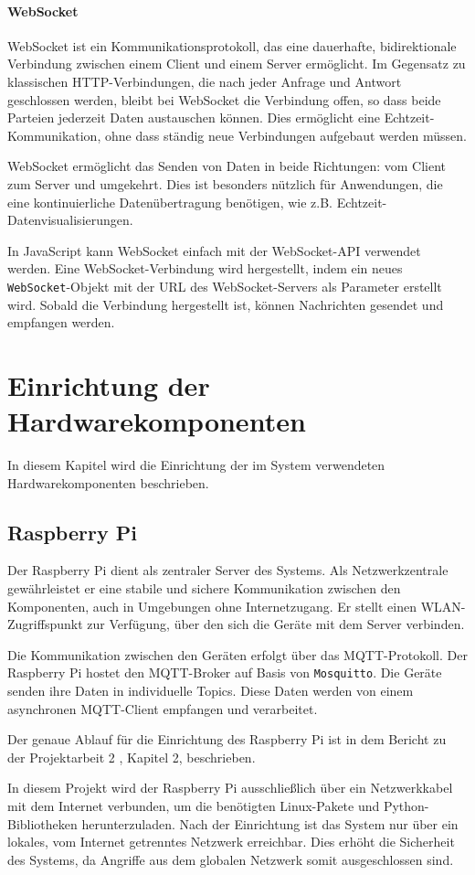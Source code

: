 \documentclass[12pt, letterpaper]{article}
\begin{document}
  \paragraph{WebSocket}  
  \par \textbf{}
  \par WebSocket ist ein Kommunikationsprotokoll, das eine dauerhafte, bidirektionale Verbindung zwischen einem Client und einem Server ermöglicht. Im Gegensatz zu klassischen HTTP-Verbindungen, die nach jeder Anfrage und Antwort geschlossen werden, bleibt bei WebSocket die Verbindung offen, so dass beide Parteien jederzeit Daten austauschen können. Dies ermöglicht eine Echtzeit-Kommunikation, ohne dass ständig neue Verbindungen aufgebaut werden müssen. 
  \par WebSocket ermöglicht das Senden von Daten in beide Richtungen: vom Client zum Server und umgekehrt. Dies ist besonders nützlich für Anwendungen, die eine kontinuierliche Datenübertragung benötigen, wie z.B. Echtzeit-Datenvisualisierungen.  
  \par In JavaScript kann WebSocket einfach mit der WebSocket-API verwendet werden. Eine WebSocket-Verbindung wird hergestellt, indem ein neues \texttt{WebSocket}-Objekt mit der URL des WebSocket-Servers als Parameter erstellt wird. Sobald die Verbindung hergestellt ist, können Nachrichten gesendet und empfangen werden.
\newpage
  \section{Einrichtung der Hardwarekomponenten}
  \par In diesem Kapitel wird die Einrichtung der im System verwendeten Hardwarekomponenten beschrieben. 
  \subsection{Raspberry Pi}
  \par Der Raspberry Pi dient als zentraler Server des Systems. Als Netzwerkzentrale gewährleistet er eine stabile und sichere Kommunikation zwischen den Komponenten, auch in Umgebungen ohne Internetzugang. Er stellt einen WLAN-Zugriffspunkt zur Verfügung, über den sich die Geräte mit dem Server verbinden.
  \par Die Kommunikation zwischen den Geräten erfolgt über das MQTT-Protokoll. Der Raspberry Pi hostet den MQTT-Broker auf Basis von \texttt{Mosquitto}. Die Geräte senden ihre Daten in individuelle Topics. Diese Daten werden von einem asynchronen MQTT-Client empfangen und verarbeitet.
  \par Der genaue Ablauf für die Einrichtung des Raspberry Pi ist in dem Bericht zu der Projektarbeit 2 \cite{pa2}, Kapitel 2, beschrieben.
  \par In diesem Projekt wird der Raspberry Pi ausschließlich über ein Netzwerkkabel mit dem Internet verbunden, um die benötigten Linux-Pakete und Python-Bibliotheken herunterzuladen. Nach der Einrichtung ist das System nur über ein lokales, vom Internet getrenntes Netzwerk erreichbar. Dies erhöht die Sicherheit des Systems, da Angriffe aus dem globalen Netzwerk somit ausgeschlossen sind.
\end{document}
